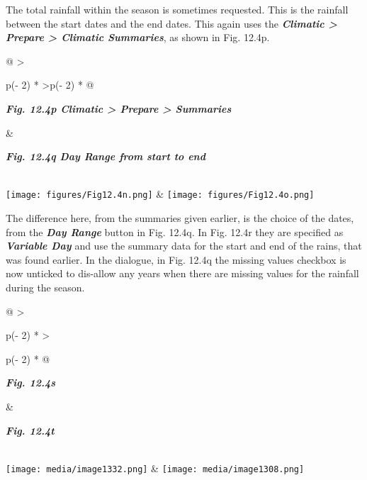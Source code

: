 \documentclass[
  letterpaper,
  DIV=11,
  numbers=noendperiod]{scrreprt}
\begin{document}
The total rainfall within the season is sometimes requested. This is the
rainfall between the start dates and the end dates. This again uses the
\textbf{\emph{Climatic \textgreater{} Prepare \textgreater{} Climatic
Summaries}}, as shown in Fig. 12.4p.

\begin{longtable}[]{@{}
  >{\raggedright\arraybackslash}p{(\columnwidth - 2\tabcolsep) * }
  >{\raggedleft\arraybackslash}p{(\columnwidth - 2\tabcolsep) * }@{}}
\toprule\noalign{}
\begin{minipage}[b]{\linewidth}\raggedright
\textbf{\emph{Fig. 12.4p Climatic \textgreater{} Prepare \textgreater{}
Summaries}}
\end{minipage} & \begin{minipage}[b]{\linewidth}\raggedleft
\textbf{\emph{Fig. 12.4q Day Range from start to end}}
\end{minipage} \\
\midrule\noalign{}
\endhead
\bottomrule\noalign{}
\endlastfoot
\texttt{[image: figures/Fig12.4n.png]}
&
\texttt{[image: figures/Fig12.4o.png]} \\
\end{longtable}

The difference here, from the summaries given earlier, is the choice of
the dates, from the \textbf{\emph{Day Range}} button in Fig. 12.4q. In
Fig. 12.4r they are specified as \textbf{\emph{Variable Day}} and use
the summary data for the start and end of the rains, that was found
earlier. In the dialogue, in Fig. 12.4q the missing values checkbox is
now unticked to dis-allow any years when there are missing values for
the rainfall during the season.

\begin{longtable}[]{@{}
  >{\raggedright\arraybackslash}p{(\columnwidth - 2\tabcolsep) * }
  >{\raggedright\arraybackslash}p{(\columnwidth - 2\tabcolsep) * }@{}}
\toprule\noalign{}
\begin{minipage}[b]{\linewidth}\raggedright
\textbf{\emph{Fig. 12.4s}}
\end{minipage} & \begin{minipage}[b]{\linewidth}\raggedright
\textbf{\emph{Fig. 12.4t}}
\end{minipage} \\
\midrule\noalign{}
\endhead
\bottomrule\noalign{}
\endlastfoot
\texttt{[image: media/image1332.png]}
&
\texttt{[image: media/image1308.png]} \\
\end{longtable}
\end{document}
